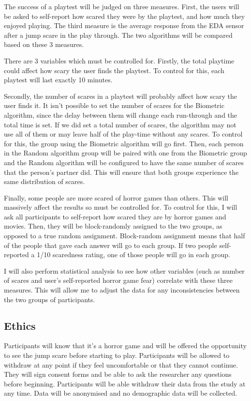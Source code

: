 \documentclass[12pt,a4paper]{article}
\begin{document}
The success of a playtest will be judged on three measures. First, the users will be asked to self-report how scared they were by the playtest, and how much they enjoyed playing. The third measure is the average response from the EDA sensor after a jump scare in the play through. The two algorithms will be compared based on these 3 measures.

There are 3 variables which must be controlled for. Firstly, the total playtime could affect how scary the user finds the playtest. To control for this, each playtest will last exactly 10 minutes.

Secondly, the number of scares in a playtest will probably affect how scary the user finds it. It isn't possible to set the number of scares for the Biometric algorithm, since the delay between them will change each run-through and the total time is set. If we did set a total number of scares, the algorithm may not use all of them or may leave half of the play-time without any scares. To control for this, the group using the Biometric algorithm will go first. Then, each person in the Random algorithm group will be paired with one from the Biometric group and the Random algorithm will be configured to have the same number of scares that the person's partner did. This will ensure that both groups experience the same distribution of scares.

Finally, some people are more scared of horror games than others. This will massively affect the results so must be controlled for. To control for this, I will ask all participants to self-report how scared they are by horror games and movies. Then, they will be block-randomly assigned to the two groups, as opposed to a true random assignment. Block-random assignment means that half of the people that gave each answer will go to each group. If two people self-reported a 1/10 scaredness rating, one of those people will go in each group.

I will also perform statistical analysis to see how other variables (such as number of scares and user's self-reported horror game fear) correlate with these three measures. This will allow me to adjust the data for any inconsistencies between the two groups of participants.

\subsection{Ethics}
Participants will know that it's a horror game and will be offered the opportunity to see the jump scare before starting to play. Participants will be allowed to withdraw at any point if they feel uncomfortable or that they cannot continue. They will sign consent forms and be able to ask the researcher any questions before beginning. Participants will be able withdraw their data from the study at any time. Data will be anonymised and no demographic data will be collected.
\end{document}
